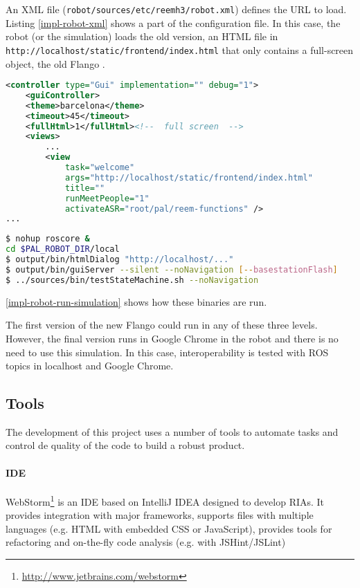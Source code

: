 An \ac{XML} file (\texttt{robot/sources/etc/reemh3/robot.xml}) defines the \ac{URL} to load.
Listing \ref{impl-robot-xml} shows a part of the configuration file.
In this case, the robot (or the simulation) loads the old version, an \ac{HTML} file in \texttt{http://localhost/static/frontend/index.html} that only contains a full-screen \flash object, the old Flango \cm .
\begin{lstlisting}[language=xml,caption=Robot configuration file, label=impl-robot-xml]
<controller type="Gui" implementation="" debug="1">
    <guiController>
    <theme>barcelona</theme>
    <timeout>45</timeout>
    <fullHtml>1</fullHtml><!--  full screen  -->
    <views>
        ...
        <view
            task="welcome" 
            args="http://localhost/static/frontend/index.html" 
            title="" 
            runMeetPeople="1"  
            activateASR="root/pal/reem-functions" />
...    
\end{lstlisting}

\begin{lstlisting}[language=bash,caption=Execution of a robot simulation, label=impl-robot-run-simulation]
$ nohup roscore &
cd $PAL_ROBOT_DIR/local
$ output/bin/htmlDialog "http://localhost/..."
$ output/bin/guiServer --silent --noNavigation [--basestationFlash]
$ ../sources/bin/testStateMachine.sh --noNavigation
\end{lstlisting}

\ref{impl-robot-run-simulation} shows how these binaries are run.

The first version of the new Flango \cm could run in any of these three levels.
However, the final version runs in Google Chrome in the robot and there is no need to use this simulation.
In this case, interoperability is tested with \ac{ROS} topics in localhost and Google Chrome.

\subsection*{Tools}
The development of this project uses a number of tools to automate tasks and control de quality of the code to build a robust product.

\paragraph{\ac{IDE}} WebStorm\footnote{\url{http://www.jetbrains.com/webstorm}} is an \ac{IDE} based on IntelliJ IDEA designed to develop \acp{RIA}.
It provides integration with major frameworks, supports files with multiple languages (e.g. \ac{HTML} with embedded \ac{CSS} or JavaScript), provides tools for refactoring and on-the-fly code analysis (e.g. with JSHint/JSLint)

